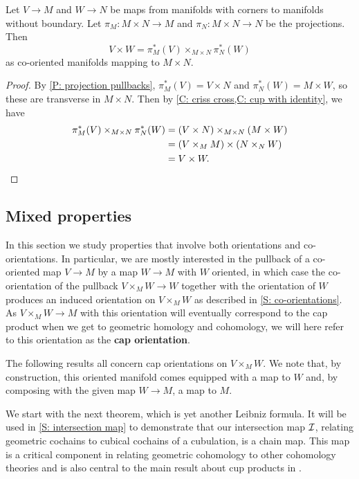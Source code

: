 \begin{corollary}\label{C: cross is cup}
	Let $V \to M$ and $W \to N$ be maps from manifolds with corners to manifolds without boundary.
	Let $\pi_M \colon M \times N \to M$ and $\pi_N \colon M \times N \to N$ be the projections.
	Then $$V \times W = \pi_M^*(V)\times_{M \times N}\pi_N^*(W)$$ as co-oriented manifolds mapping to $M \times N$.
\end{corollary}

\begin{proof}
	By \cref{P: projection pullbacks}, $\pi_M^*(V) = V \times N$ and $\pi_N^*(W) = M \times W$, so these are transverse in $M \times N$.
	Then by \cref{C: criss cross,C: cup with identity}, we have
	\begin{align*}
		\pi_M^*(V)\times_{M \times N}\pi_N^*(W)& = (V \times N)\times_{M \times N} (M \times W)\\
		& = (V \times_M M) \times (N \times_N W)\\
		& = V \times W.\qedhere
	\end{align*}
\end{proof}

\subsection{Mixed properties}

In this section we study properties that involve both orientations and co-orientations.
In particular, we are mostly interested in the pullback of a co-oriented map $V \to M$ by a map $W \to M$ with $W$ oriented, in which case the co-orientation of the pullback $V \times_M W \to W$ together with the orientation of $W$ produces an induced orientation on $V \times_M W$ as described in \cref{S: co-orientations}.
As $V \times_M W \to M$ with this orientation will eventually correspond to the cap product when we get to geometric homology and cohomology, we will here refer to this orientation as the \textbf{cap orientation}.

The following results all concern cap orientations on $V \times_M W$.
We note that, by construction, this oriented manifold comes equipped with a map to $W$ and, by composing with the given map $W \to M$, a map to $M$.

We start with the next theorem, which is yet another Leibniz formula.
It will be used in \cref{S: intersection map} to demonstrate that our intersection map $\mathcal{I}$, relating geometric cochains to cubical cochains of a cubulation, is a chain map.
This map is a critical component in relating geometric cohomology to other cohomology theories and is also central to the main result about cup products in \cite{FMS-flows}.

